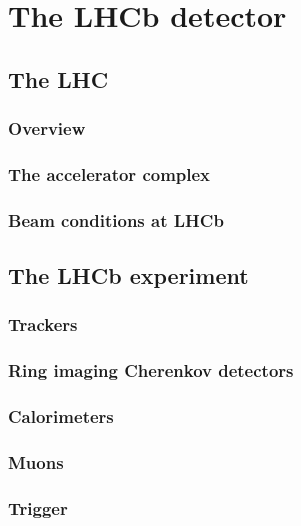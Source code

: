 \chapter{The LHCb detector} 
\label{ch:detector}
\minitoc




\section{The LHC}

\subsection{Overview}
\subsection{The accelerator complex}
\subsection{Beam conditions at LHCb}

\section{The LHCb experiment}

\subsection{Trackers}
\subsection{Ring imaging Cherenkov detectors}
\subsection{Calorimeters}
\subsection{Muons}
\subsection{Trigger}